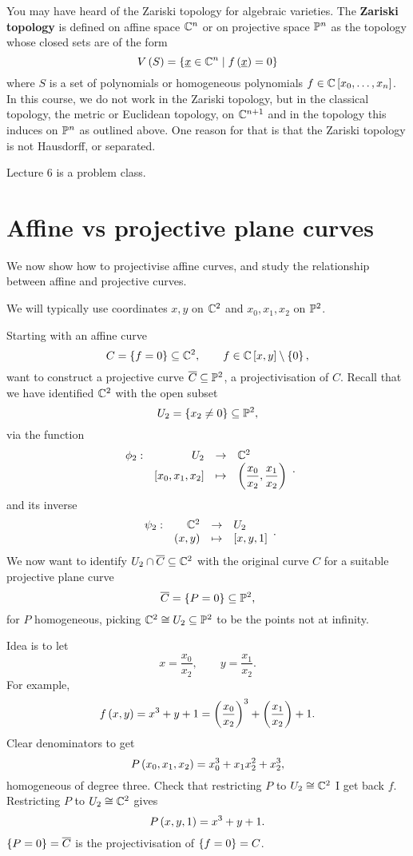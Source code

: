 \begin{remark}
You may have heard of the Zariski topology for algebraic varieties. The \textbf{Zariski topology} is defined on affine space $ \C^n $ or on projective space $ \P^n $ as the topology whose closed sets are of the form
$$ V\rb{S} = \cb{\underline{x} \in \C^n \mid f\rb{\underline{x}} = 0} $$
where $ S $ is a set of polynomials or homogeneous polynomials $ f \in \C\sb{x_0, \dots, x_n} $. In this course, we do not work in the Zariski topology, but in the classical topology, the metric or Euclidean topology, on $ \C^{n + 1} $ and in the topology this induces on $ \P^n $ as outlined above. One reason for that is that the Zariski topology is not Hausdorff, or separated.
\end{remark}


Lecture 6 is a problem class.

\pagebreak

\section{Affine vs projective plane curves}

We now show how to projectivise affine curves, and study the relationship between affine and projective curves.

\begin{notation}
We will typically use coordinates $ x, y $ on $ \C^2 $ and $ x_0, x_1, x_2 $ on $ \P^2 $.
\end{notation}

Starting with an affine curve
$$ C = \cb{f = 0} \subseteq \C^2, \qquad f \in \C\sb{x, y} \setminus \cb{0}, $$
want to construct a projective curve $ \overline{C} \subseteq \P^2 $, a projectivisation of $ C $. Recall that we have identified $ \C^2 $ with the open subset
$$ U_2 = \cb{x_2 \ne 0} \subseteq \P^2, $$
via the function
$$ \function[\phi_2]{U_2}{\C^2}{\sb{x_0, x_1, x_2}}{\rb{\dfrac{x_0}{x_2}, \dfrac{x_1}{x_2}}}. $$
and its inverse
$$ \function[\psi_2]{\C^2}{U_2}{\rb{x, y}}{\sb{x, y, 1}}. $$
We now want to identify $ U_2 \cap \overline{C} \subseteq \C^2 $ with the original curve $ C $ for a suitable projective plane curve
$$ \overline{C} = \cb{P = 0} \subseteq \P^2, $$
for $ P $ homogeneous, picking $ \C^2 \cong U_2 \subseteq \P^2 $ to be the points not at infinity.

\begin{example*}
Idea is to let
$$ x = \dfrac{x_0}{x_2}, \qquad y = \dfrac{x_1}{x_2}. $$
For example,
$$ f\rb{x, y} = x^3 + y + 1 = \rb{\dfrac{x_0}{x_2}}^3 + \rb{\dfrac{x_1}{x_2}} + 1. $$
Clear denominators to get
$$ P\rb{x_0, x_1, x_2} = x_0^3 + x_1x_2^2 + x_2^3, $$
homogeneous of degree three. Check that restricting $ P $ to $ U_2 \cong \C^2 $ I get back $ f $. Restricting $ P $ to $ U_2 \cong \C^2 $ gives
$$ P\rb{x, y, 1} = x^3 + y + 1. $$
$ \cb{P = 0} = \overline{C} $ is the projectivisation of $ \cb{f = 0} = C $.
\end{example*}

